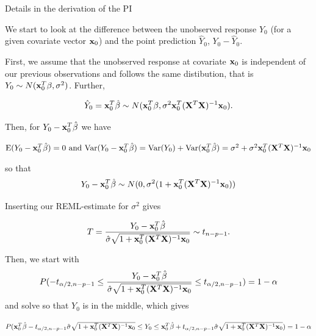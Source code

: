 \documentclass[10pt,ignorenonframetext,]{beamer}
\begin{document}
\begin{frame}

\begin{block}{Details in the derivation of the PI}

We start to look at the difference between the unobserved response
\(Y_0\) (for a given covariate vector \({\bf x}_0\)) and the point
prediction \(\hat{Y}_0\), \(Y_0-\hat{Y}_0\).

First, we assume that the unobserved response at covariate \({\bf x}_0\)
is independent of our previous observations and follows the same
distibution, that is \(Y_0 \sim N({\bf x}_0^T \beta,\sigma^2)\).
Further,

\[\hat{Y}_0={\bf x}_0^T \hat{\beta} \sim N({\bf x}_0^T \beta,\sigma^2 {\bf x}_0^T({\bf X}^T{\bf X})^{-1}{\bf x}_0).\]

Then, for \(Y_0-{\bf x}_0^T \hat{\beta}\) we have

\(\text{E}(Y_0-{\bf x}_0^T \hat{\beta})=0 \text{ and } \text{Var}(Y_0-{\bf x}_0^T \hat{\beta})=\text{Var}(Y_0)+\text{Var}({\bf x}_0^T \hat{\beta})=\sigma^2+\sigma^2{\bf x}_0^T({\bf X}^T{\bf X})^{-1}{\bf x}_0\)

so that
\[Y_0-{\bf x}_0^T \hat{\beta}\sim N(0,\sigma^2 (1+{\bf x}_0^T({\bf X}^T{\bf X})^{-1}{\bf x}_0)) \]

\end{block}

\end{frame}

\begin{frame}

Inserting our REML-estimate for \(\sigma^2\) gives

\[T=\frac{Y_0-{\bf x}_0^T \hat{\beta}}{\hat{\sigma}\sqrt{1+{\bf x}_0^T({\bf X}^T{\bf X})^{-1}{\bf x}_0}}\sim t_{n-p-1}.\]

Then, we start with
\[ P(-t_{\alpha/2,n-p-1}\le \frac{Y_0-{\bf x}_0^T \hat{\beta}}{\hat{\sigma}\sqrt{1+{\bf x}_0^T({\bf X}^T{\bf X})^{-1}{\bf x}_0}} \le t_{\alpha/2,n-p-1})=1-\alpha\]
and solve so that \(Y_0\) is in the middle, which gives

\(P({\bf x}_0^T \hat{\beta}-t_{\alpha/2,n-p-1}\hat{\sigma}\sqrt{1+{\bf x}_0^T({\bf X}^T{\bf X})^{-1}{\bf x}_0} \le Y_0 \le {\bf x}_0^T \hat{\beta}+t_{\alpha/2,n-p-1}\hat{\sigma}\sqrt{1+{\bf x}_0^T({\bf X}^T{\bf X})^{-1}{\bf x}_0})=1-\alpha\)

\end{frame}
\end{document}
